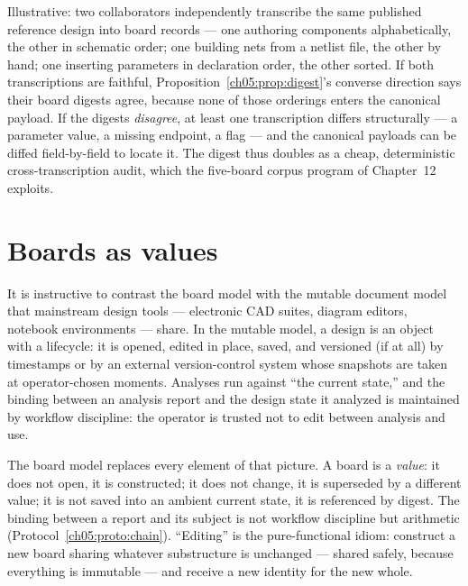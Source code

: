 \begin{example}
\label{ch05:ex:transcription}
Illustrative: two collaborators independently transcribe the same
published reference design into board records --- one authoring
components alphabetically, the other in schematic order; one building
nets from a netlist file, the other by hand; one inserting parameters
in declaration order, the other sorted. If both transcriptions are
faithful, Proposition~\ref{ch05:prop:digest}'s converse direction says
their board digests agree, because none of those orderings enters the
canonical payload. If the digests \emph{disagree}, at least one
transcription differs structurally --- a parameter value, a missing
endpoint, a flag --- and the canonical payloads can be diffed
field-by-field to locate it. The digest thus doubles as a cheap,
deterministic cross-transcription audit, which the five-board corpus
program of Chapter~12 exploits.
\end{example}

\section{Boards as values}\label{ch05:sec:values}

It is instructive to contrast the board model with the mutable
document model that mainstream design tools --- electronic CAD suites,
diagram editors, notebook environments --- share. In the mutable model,
a design is an object with a lifecycle: it is opened, edited in place,
saved, and versioned (if at all) by timestamps or by an external
version-control system whose snapshots are taken at operator-chosen
moments. Analyses run against ``the current state,'' and the binding
between an analysis report and the design state it analyzed is
maintained by workflow discipline: the operator is trusted not to edit
between analysis and use.

The board model replaces every element of that picture. A board is a
\emph{value}: it does not open, it is constructed; it does not change,
it is superseded by a different value; it is not saved into an ambient
current state, it is referenced by digest. The binding between a report
and its subject is not workflow discipline but arithmetic
(Protocol~\ref{ch05:proto:chain}). ``Editing'' is the pure-functional
idiom: construct a new board sharing whatever substructure is unchanged
--- shared safely, because everything is immutable --- and receive a
new identity for the new whole.

